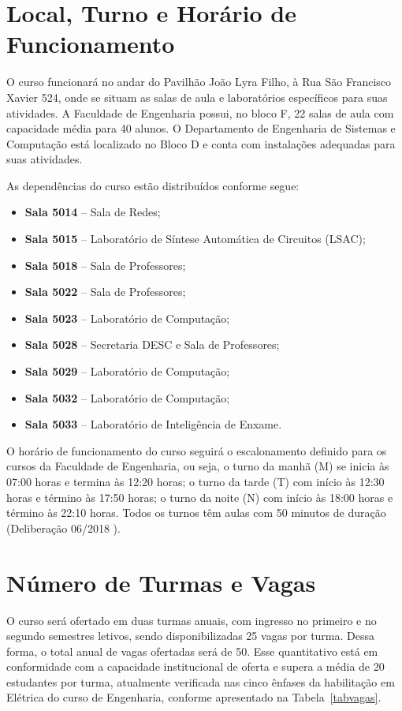\section{Local, Turno e Horário de Funcionamento}

O curso funcionará no  andar do Pavilhão João Lyra Filho, à Rua São Francisco Xavier  524, onde se situam as salas de aula e laboratórios específicos para suas atividades. A Faculdade de Engenharia possui, no bloco F, 22 salas de aula com capacidade média
para 40 alunos. O Departamento de Engenharia de Sistemas e Computação está localizado no Bloco D e conta com instalações adequadas para suas atividades.



As dependências do curso estão distribuídos conforme segue:
\begin{itemize}
  \item \textbf{Sala 5014} -- Sala de Redes;
  \item \textbf{Sala 5015} -- Laboratório de Síntese Automática de Circuitos (LSAC);
  \item \textbf{Sala 5018} -- Sala de Professores;
  \item \textbf{Sala 5022} -- Sala de Professores;
  \item \textbf{Sala 5023} -- Laboratório de Computação;
  \item \textbf{Sala 5028} -- Secretaria DESC e Sala de Professores;
  \item \textbf{Sala 5029} -- Laboratório de Computação;
  \item \textbf{Sala 5032} -- Laboratório de Computação;
  \item \textbf{Sala 5033} -- Laboratório de Inteligência de Enxame.
\end{itemize}


O horário de funcionamento do curso seguirá o escalonamento definido para os cursos da Faculdade de Engenharia, ou seja, o turno da manhã (M) se inicia às 07:00 horas e termina às 12:20 horas; o turno da tarde (T) com início às 12:30 horas e término às 17:50 horas; o turno da noite (N) com início às 18:00 horas e término às 22:10 horas. Todos os turnos têm aulas com 50 minutos de duração (Deliberação  06/2018 \cite{uerj2018}).

\section{Número de Turmas e Vagas}
O curso será ofertado em duas turmas anuais, com ingresso no primeiro e no segundo semestres letivos, sendo disponibilizadas 25 vagas por turma. Dessa forma, o total anual de vagas ofertadas será de 50. Esse quantitativo está em conformidade com a capacidade institucional de oferta e supera a média de 20 estudantes por turma, atualmente verificada nas cinco ênfases da habilitação em Elétrica do curso de Engenharia, conforme apresentado na Tabela~\ref{tabvagas}.

